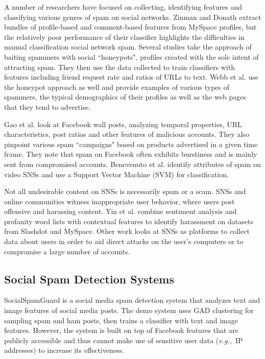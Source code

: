 \documentclass[preprint]{acm_proc_article-sp}
\newcommand{\eg}{{\em e.g.,}~}
\begin{document}
A number of researchers have focused on collecting, identifying features 
and classifying various genres of spam on social networks. Zinman and 
Donath \cite{zinman} extract bundles of profile-based and comment-based 
features from MySpace profiles, but the relatively poor performance of their classifier highlights 
the difficulties in manual classification social network spam. Several 
studies take the approach of baiting spammers with social ``honeypots", profiles 
created with the sole intent of attracting spam.\cite{stringhini, lee} They 
then use the data collected to train classifiers with features including 
friend request rate and ratios of URLs to text. Webb et al. \cite{webb} use 
the honeypot approach as well and provide examples of various types of spammers, 
the typical demographics of their profiles as well as the web pages that they tend to advertise. 

Gao et al. \cite{gao} look at Facebook wall posts, analyzing temporal properties, 
URL characteristics, post ratios and other features of malicious accounts. They 
also pinpoint various spam ``campaigns" based on products advertised in a given 
time frame. They note that spam on Facebook often exhibits burstiness and is mainly 
sent from compromised accounts. Benevenuto et al. \cite{benevenuto} identify 
attributes of spam on video SNSs and use a Support Vector Machine (SVM) for classification.

Not all undesirable content on SNSs is necessarily spam or a scam. SNSs and 
online communities witness inappropriate user behavior, where users post offensive 
and harassing content. Yin et al. \cite{yin} combine sentiment analysis and profanity 
word lists with contextual features to identify harassment on datasets from Slashdot 
and MySpace. Other work looks at SNSs as platforms to collect data about users in 
order to aid direct attacks on the user's computers or to compromise a large 
number of accounts. \cite{patsakis, huber}

\subsection{Social Spam Detection Systems}

SocialSpamGuard \cite{jin} is a social media spam detection system that analyzes 
text and image features of social media posts. The demo system uses GAD 
clustering \cite{jingad} for sampling spam and ham posts, then trains a 
classifier with text and image features. However, the system is built on top 
of Facebook features that are publicly accessible and thus cannot make use of 
sensitive user data (\eg IP addresses) to increase its effectiveness. 
\end{document}
